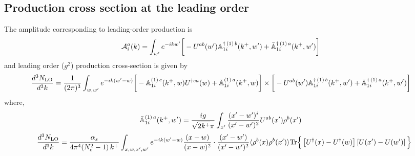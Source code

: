 \documentclass[10pt]{article}
\def\mf#1{\mathbb{#1}}
\numberwithin{equation}{section}
\begin{document}
\subsection{Production cross section at the leading order}
The amplitude corresponding to leading-order production is
\begin{align}
   {\cal A}^{a}_{i}(k) & = \int_{w^{\prime}} e^{-ikw^{\prime}} \bigg[-U^{ab}(w^{\prime})\mf{A}^{\dagger\,(1)\, b}_{1i}(k^{+},w^{\prime})+\Bar{\mf{A}}^{\dagger\, (1)\, a}_{1i}(k^{+}, w^{\prime})\bigg]
\end{align}
and leading order ($g^2$) production cross-section is given by
\begin{align}
    \frac{d^{3}N_{\rm LO}}{d^{3}k} & = \frac{1}{(2\pi)^{3}} \int_{w,w^{\prime}} e^{-ik(w^{\prime}-w)} \bigg[-\mf{A}^{(1)\, c}_{1i}(k^{+},w)U^{\dagger ca}(w)+\Bar{\mf{A}}^{(1)\, a}_{1i}(k^{+}, w)\bigg]\times \bigg[-U^{ab}(w^{\prime})\mf{A}^{\dagger\,(1)\, b}_{1i}(k^{+},w^{\prime})+\Bar{\mf{A}}^{\dagger\, (1)\, a}_{1i}(k^{+}, w^{\prime})\bigg]
\end{align}
where,
\begin{align}
    \Bar{\mf{A}}^{(1)\, a}_{1i}(k^{+},w^{\prime}) & = \frac{ig}{\sqrt{2k^+}\pi}\int_{x^{\prime}}\frac{(x^{\prime}-w^{\prime})^{i}}{(x^{\prime}-w^{\prime})^{2}} U^{ab}(x^{\prime})\rho^{b}(x^{\prime}) 
\end{align}
\begin{align}
    \frac{d^{3}N_{\rm LO}}{d^{3}k} = \frac{\alpha_s } {4\pi^{4} (N_c^2-1)\, k^{+}}\int_{x,w,x^{\prime},w^{\prime}}
    e^{-ik(w^{\prime}-w)} 
    \frac{(x-w)}{(x-w)^{2}} \cdot
    \frac{(x^{\prime}-w^{\prime})}{(x^{\prime}-w^{\prime})^{2}}
   \langle  \rho^{b}(x) \rho^{b}(x^{\prime}) \rangle
    {\rm Tr} \Big\{\left[U^{\dagger}(x)-U^{\dagger}(w)\right]\left[U(x^{\prime})-U(w^{\prime})\right]\Big\}
\end{align}
\end{document}

